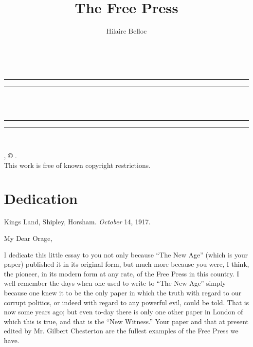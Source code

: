 \documentclass{book}
\date{}
\title{The Free Press}
\author{Hilaire Belloc}
\begin{document}
\thispagestyle{empty}
\begin{center}
	{\Huge \@title   \\[5mm]}
\end{center}
\newpage
\thispagestyle{empty}
\cleardoublepage
\begin{center}
	\thispagestyle{empty}
	\vspace*{\baselineskip}
	\rule{\textwidth}{1.6pt}\vspace*{-\baselineskip}\vspace*{2pt}
	\rule{\textwidth}{0.4pt}\\[\baselineskip]
	{\Huge\scshape \@title   \\[5mm]}
	{\Large }
	\rule{\textwidth}{0.4pt}\vspace*{-\baselineskip}\vspace{3.2pt}
	\rule{\textwidth}{1.6pt}\\[\baselineskip]
	\vspace*{4\baselineskip}
	{\Large \@author}
	\vfill
\end{center}
\pagebreak
\newpage
\thispagestyle{empty}
\null\vfill
\noindent
\begin{center}
	{\emph{\@title}, © \@author.\\[5mm]}
	{This work is free of known copyright restrictions.\\[5mm]}
\end{center}
\pagebreak
\newpage
\setcounter{tocdepth}{0}
\setcounter{secnumdepth}{0}

\chapter*{Dedication}
\label{chapter-0}
Kings Land, Shipley, Horsham. \emph{October} 14, 1917.

My Dear Orage,

I dedicate this little essay to you not only because “The New Age” (which is your paper) published it in its original form, but much more because you were, I think, the pioneer, in its modern form at any rate, of the Free Press in this country. I well remember the days when one used to write to “The New Age” simply because one knew it to be the only paper in which the truth with regard to our corrupt politics, or indeed with regard to any powerful evil, could be told. That is now some years ago; but even to-day there is only one other paper in London of which this is true, and that is the “New Witness.” Your paper and that at present edited by Mr. Gilbert Chesterton are the fullest examples of the Free Press we have.
\end{document}
